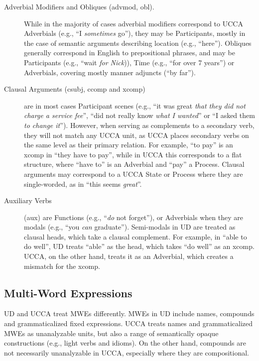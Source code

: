 \documentclass[11pt,a4paper]{article}
\begin{document}
\begin{description}
    \item[Adverbial Modifiers and Obliques (advmod, obl).] While in the majority of cases
    adverbial modifiers correspond to UCCA Adverbials (e.g., ``I \textit{sometimes} go''),
    they may be Participants, mostly in the case of semantic arguments describing location (e.g., ``here'').
    Obliques generally correspond in English to prepositional phrases, and may be
    Participants (e.g., ``wait \textit{for Nick})), Time (e.g., ``for over 7 years'') 
    or Adverbials, covering mostly manner adjuncts (``by far'').

    \item[Clausal Arguments (csubj, ccomp and xcomp)] 
    are in most cases Participant scenes
    (e.g., ``it was great \textit{that they did not charge a service fee}'',
    ``did not really know \textit{what I wanted}'' or
    ``I asked them \textit{to change it}'').
    However, when serving as complements to a secondary verb, they
    will not match any UCCA unit, as UCCA places secondary verbs on the 
    same level as their primary relation. 
    For example, ``to pay'' is an xcomp in ``they have to pay'', while in UCCA
    this corresponds to a flat structure, where ``have to'' is an Adverbial and ``pay'' a Process.
    Clausal arguments may correspond to a UCCA State or Process where
    they are single-worded, as in ``this seems \textit{great}''.

    \item[Auxiliary Verbs] (aux) are Functions (e.g., ``\textit{do} not forget''),
    or Adverbials when they are modals (e.g., ``you \textit{can} graduate''). Semi-modals 
    in UD are treated as clausal heads, which take a clausal complement. 
    For example, in ``able to do well'', UD treats ``able'' as the head, which takes ``do well'' as an xcomp. UCCA, on the other hand, treats it as an Adverbial, which creates a mismatch for the xcomp.
    
\end{description}    
    

\subsection{Multi-Word Expressions}\label{sec:mwe}

UD and UCCA treat MWEs differently.
MWEs in UD include names, compounds and grammaticalized fixed expressions.
UCCA treats names and grammaticalized MWEs as unanalyzable units,
but also a range of semantically opaque constructions
(e.g., light verbs and idioms).
On the other hand, compounds are not necessarily unanalyzable in UCCA,
especially where they are compositional.
\end{document}
